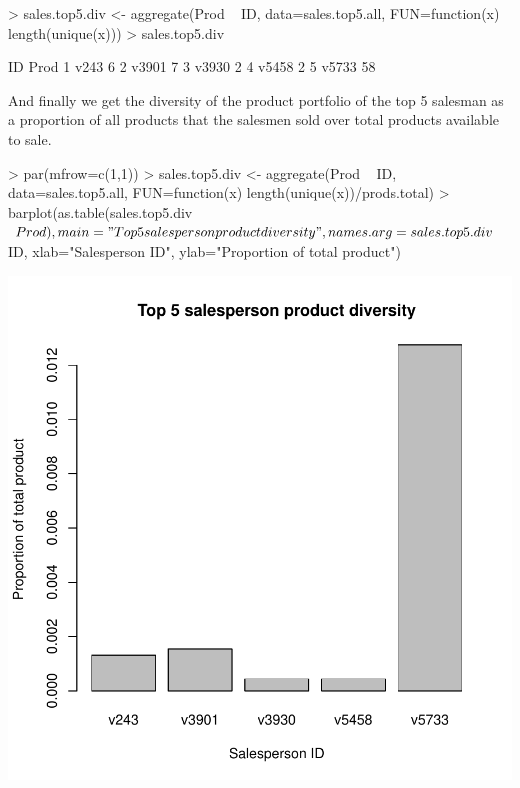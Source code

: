 \documentclass{article}
\begin{document}
\begin{Schunk}
\begin{Sinput}
> sales.top5.div <- aggregate(Prod ~ ID, data=sales.top5.all, FUN=function(x) length(unique(x)))
> sales.top5.div
\end{Sinput}
\begin{Soutput}
     ID Prod
1  v243    6
2 v3901    7
3 v3930    2
4 v5458    2
5 v5733   58
\end{Soutput}
\end{Schunk}

And finally we get the diversity of the product portfolio of the top 5 salesman as a proportion of all products that the salesmen sold over total products available to sale.

\begin{Schunk}
\begin{Sinput}
> par(mfrow=c(1,1))
> sales.top5.div <- aggregate(Prod ~ ID, data=sales.top5.all, FUN=function(x) length(unique(x))/prods.total)
> barplot(as.table(sales.top5.div$Prod), main="Top 5 salesperson product diversity", names.arg=sales.top5.div$ID, xlab="Salesperson ID", ylab="Proportion of total product")
\end{Sinput}
\end{Schunk}
\includegraphics{KevinZollicoffer_Assignment3-008}
\end{document}
